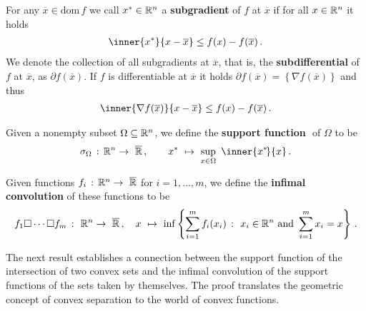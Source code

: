 For any $\overline{x}\in\mathrm{dom}\,f$ we call $x^*\in\mathbb{R}^n$ a 
\textbf{subgradient} of $f$ at $\overline{x}$ if for all 
$x\in\mathbb{R}^n$ it holds
\begin{gather}
  \inner{x^*}{x-\overline{x}}
  \le
  f(x)
  -
  f(\overline{x})
  \,.
\end{gather}
We denote the collection of all subgradients at $\overline{x}$, that is, the \textbf{subdifferential} of $f$ at $\overline{x}$, as
$
\partial f(\overline{x})
$.
If $f$ is differentiable at $\overline{x}$ it holds
$
\partial f(\overline{x})
=
\left\{ 
  \nabla
  f(\overline{x})
\right\}
$
and thus
\begin{gather}
  \label{cv:primer:mvthe}
  \inner{
  \nabla
  f(\overline{x})
}{x-\overline{x}}
  \le
  f(x)
  -
  f(\overline{x})
  \,.
\end{gather}
\begin{definition}
  Given a nonempty subset 
  $\Omega \subseteq \mathbb{R}^n$,
  we define
  the \textbf{support function} 
  $
  $
  of $\Omega$
  to be
  \begin{gather*}
  \sigma_\Omega 
  \,
  :
  \,
  \R^n \to\  \overline{\R}
  \,,
  \qquad
  x^*
  \ 
  \mapsto
  \ 
    \sup_{x \in \Omega}
    \ 
    \inner{x^*\!}{x}
    \,.
  \end{gather*}
\end{definition}


\begin{definition}
  Given functions
  $
    f_i\,:\,
    \mathbb{R}^n \to\  \overline{\mathbb{R}}
  $
  for $ i = 1, \ldots, m $,
  we define the \textbf{infimal convolution} of these functions to be
  \begin{gather*}
    f_1 \square \cdots \square f_m
    \ 
    \colon
    \ 
    \R^n
    \to
    \ 
    \overline{\R}
    \,,
    \quad
    x
    \ 
    \mapsto
    \ 
    \inf
    \left\{ 
    \sum_{i = 1}^{m}
      f_i(x_i)
      \ 
      \colon
      \ 
      x_i \in \R^n 
      \ 
      \mathrm{and}\ 
      \sum_{i = 1}^{m} 
        x_i
      =
      x
    \right\}
    \,.
  \end{gather*}
\end{definition}
 
The next result establishes a connection between the support function of the intersection of two convex sets and the infimal convolution of the support functions of the sets taken by themselves.
The proof translates the geometric concept of convex separation to the world of convex functions.

